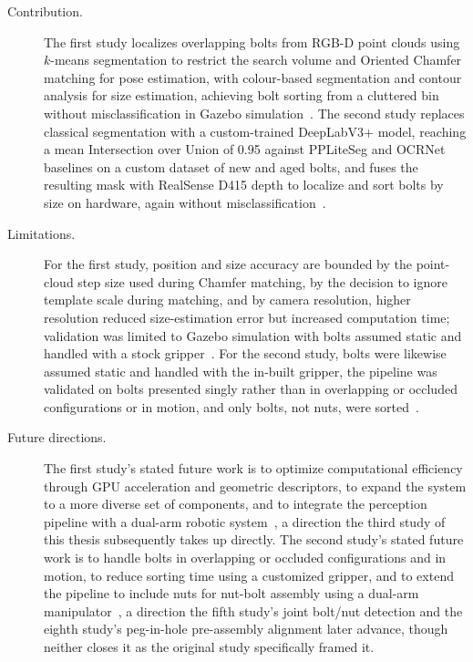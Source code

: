 \begin{description}
    \item[Contribution.] The first study localizes overlapping bolts from RGB-D point clouds using
    $k$-means segmentation to restrict the search volume and Oriented Chamfer matching for pose
    estimation, with colour-based segmentation and contour analysis for size estimation, achieving
    bolt sorting from a cluttered bin without misclassification in Gazebo
    simulation~\citep{sk2024bolthandling}. The second study replaces classical segmentation with a
    custom-trained DeepLabV3+ model, reaching a mean Intersection over Union of 0.95 against
    PPLiteSeg and OCRNet baselines on a custom dataset of new and aged bolts, and fuses the resulting
    mask with RealSense D415 depth to localize and sort bolts by size on hardware, again without
    misclassification~\citep{sk2024boltsorting}.

    \item[Limitations.] For the first study, position and size accuracy are bounded by the
    point-cloud step size used during Chamfer matching, by the decision to ignore template scale
    during matching, and by camera resolution, higher resolution reduced size-estimation error but
    increased computation time; validation was limited to Gazebo simulation with bolts assumed
    static and handled with a stock gripper~\citep{sk2024bolthandling}. For the second study, bolts
    were likewise assumed static and handled with the in-built gripper, the pipeline was validated
    on bolts presented singly rather than in overlapping or occluded configurations or in motion, and
    only bolts, not nuts, were sorted~\citep{sk2024boltsorting}.

    \item[Future directions.] The first study's stated future work is to optimize computational
    efficiency through GPU acceleration and geometric descriptors, to expand the system to a more
    diverse set of components, and to integrate the perception pipeline with a dual-arm robotic
    system~\citep{sk2024bolthandling}, a direction the third study of this thesis subsequently takes
    up directly. The second study's stated future work is to handle bolts in overlapping or occluded
    configurations and in motion, to reduce sorting time using a customized gripper, and to extend
    the pipeline to include nuts for nut-bolt assembly using a dual-arm
    manipulator~\citep{sk2024boltsorting}, a direction the fifth study's joint bolt/nut detection and
    the eighth study's peg-in-hole pre-assembly alignment later advance, though neither closes it as
    the original study specifically framed it.
\end{description}

